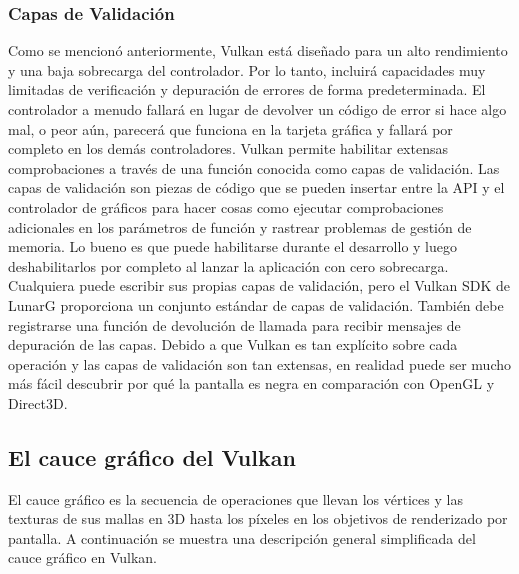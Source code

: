 \documentclass[a4paper, 17pt]{book}
\begin{document}
\subsubsection{Capas de Validación} 
\label{subsec:CapsVulkan}

Como se mencionó anteriormente, Vulkan está diseñado para un alto rendimiento y una baja sobrecarga del controlador.
Por lo tanto, incluirá capacidades muy limitadas de verificación y depuración de errores de forma predeterminada.
El controlador a menudo fallará en lugar de devolver un código de error si hace algo mal, o peor aún, parecerá que
funciona en la tarjeta gráfica y fallará por completo en los demás controladores.
Vulkan permite habilitar extensas comprobaciones a través de una función conocida como capas de validación.
Las capas de validación son piezas de código que se pueden insertar entre la API y el controlador de gráficos
para hacer cosas como ejecutar comprobaciones adicionales en los parámetros de función y rastrear problemas
de gestión de memoria. Lo bueno es que puede habilitarse durante el desarrollo y luego deshabilitarlos por
completo al lanzar la aplicación con cero sobrecarga. Cualquiera puede escribir sus propias capas de validación,
pero el Vulkan SDK de LunarG proporciona un conjunto estándar de capas de validación. También debe registrarse
una función de devolución de llamada para recibir mensajes de depuración de las capas.
Debido a que Vulkan es tan explícito sobre cada operación y las capas de validación son tan extensas, en realidad
puede ser mucho más fácil descubrir por qué la pantalla es negra en comparación con OpenGL y Direct3D.

\subsection{El cauce gráfico del Vulkan} 
\label{subsec:CauceVulkan}

El cauce gráfico es la secuencia de operaciones que llevan los vértices y las texturas de sus mallas en 3D hasta
los píxeles en los objetivos de renderizado por pantalla. A continuación se muestra una descripción general
simplificada del cauce gráfico en Vulkan.
\end{document}

